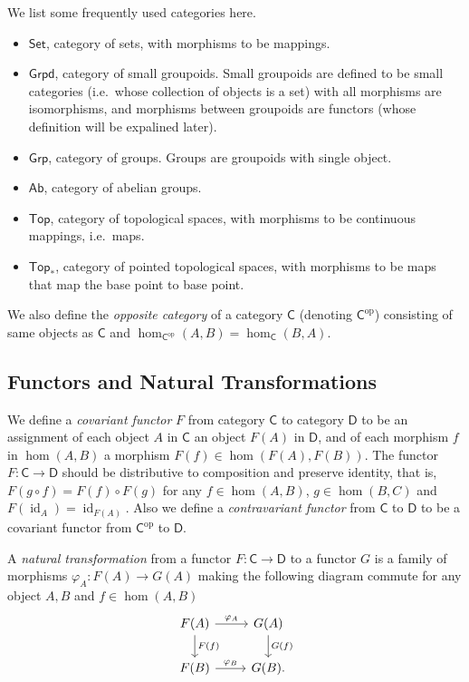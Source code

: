 \documentclass[a4paper]{amsart}
\theoremstyle{plain}
\theoremstyle{definition}
\theoremstyle{remark}
\begin{document}
We list some frequently used categories here.
\begin{itemize}
    \item $\mathsf{Set}$, category of sets, with morphisms to be mappings.
    \item $\mathsf{Grpd}$, category of small groupoids.
    Small groupoids are defined to be small categories (i.e.\ whose collection of objects is a set) with all morphisms are isomorphisms, and morphisms between groupoids are functors (whose definition will be expalined later).
    \item $\mathsf{Grp}$, category of groups.
    Groups are groupoids with single object.
    \item $\mathsf{Ab}$, category of abelian groups.
    \item $\mathsf{Top}$, category of topological spaces, with morphisms to be continuous mappings, i.e.\ maps.
    \item $\mathsf{Top}_*$, category of pointed topological spaces, with morphisms to be maps that map the base point to base point.
\end{itemize}

We also define the \emph{opposite category} of a category $\mathsf{C}$ (denoting $\mathsf{C}^{\mathrm{op}}$) consisting of same objects as $\mathsf{C}$ and $\hom_{\mathsf{C}^{\mathrm{op}}}(A,B)=\hom_\mathsf{C}(B,A)$.

\subsection{Functors and Natural Transformations}

We define a \emph{covariant functor} $F$ from category $\mathsf{C}$ to category $\mathsf{D}$ to be an assignment of each object $A$ in $\mathsf{C}$ an object $F(A)$ in $\mathsf{D}$, and of each morphism $f$ in $\hom(A,B)$ a morphism $F(f)\in\hom(F(A),F(B))$.
The functor $F:\mathsf{C}\to\mathsf{D}$ should be distributive to composition and preserve identity, that is, $F(g\circ f)=F(f)\circ F(g)$ for any $f\in\hom(A,B)$, $g\in\hom(B,C)$ and $F(\operatorname{id}_A)=\operatorname{id}_{F(A)}$.
Also we define a \emph{contravariant functor} from $\mathsf{C}$ to $\mathsf{D}$ to be a covariant functor from $\mathsf{C}^{\mathrm{op}}$ to $\mathsf{D}$.

A \emph{natural transformation} from a functor $F:\mathsf{C}\to\mathsf{D}$ to a functor $G$ is a family of morphisms $\varphi_A:F(A)\to G(A)$ making the following diagram commute for any object $A,B$ and $f\in\hom(A,B)$
\[\begin{tikzcd}
    F(A) \ar[r, "{\varphi_A}"] \ar[d, "F(f)"] & G(A) \ar[d, "{G(f)}"] \\
    F(B) \ar[r, "{\varphi_B}"] & G(B).
\end{tikzcd}\]
\end{document}
